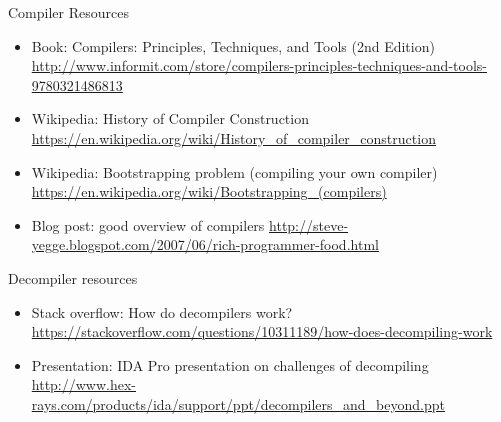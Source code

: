 \documentclass{beamer}
\begin{document}
\begin{frame}{Compiler Resources}
  \begin{itemize}
    \item Book: Compilers: Principles, Techniques, and Tools (2nd
      Edition) \url{http://www.informit.com/store/compilers-principles-techniques-and-tools-9780321486813}
    \item Wikipedia: History of Compiler Construction
      \url{https://en.wikipedia.org/wiki/History_of_compiler_construction}
    \item Wikipedia: Bootstrapping problem (compiling your own
      compiler)
      \url{https://en.wikipedia.org/wiki/Bootstrapping_(compilers)}
    \item Blog post: good overview of compilers \url{http://steve-yegge.blogspot.com/2007/06/rich-programmer-food.html}
    \end{itemize}
\end{frame}

\begin{frame}{Decompiler resources}
  \begin{itemize}
    \item Stack overflow: How do decompilers work?
      \url{https://stackoverflow.com/questions/10311189/how-does-decompiling-work}
    \item Presentation: IDA Pro presentation on challenges of
      decompiling
      \url{http://www.hex-rays.com/products/ida/support/ppt/decompilers_and_beyond.ppt}
  \end{itemize}
\end{frame}
\end{document}
